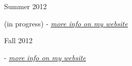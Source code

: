 
\flushleft \begin{minipage}[t]{\dateColWidth}
Summer 2012
\end{minipage}
\begin{minipage}[t]{0.8\textwidth}
	 (in progress)
	 - 
	\href{http://www.claytonketner.com/robotic-arm-mk2/}{\uline{\textit{more info on my website}}}
	
\end{minipage}

\divLine

\flushleft \begin{minipage}[t]{\dateColWidth}
Fall 2012
\end{minipage}
\begin{minipage}[t]{0.8\textwidth}
	 - 
	\href{http://www.claytonketner.com/senior-project-robot/}{\uline{\textit{more info on my website}}}

\end{minipage}
